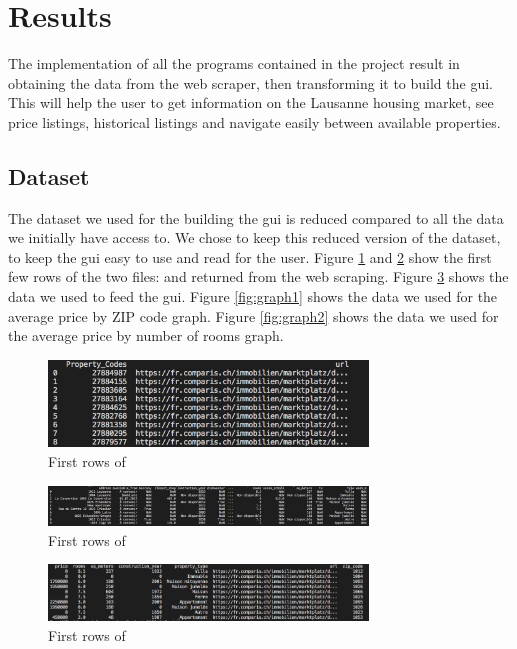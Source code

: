 \documentclass[main]{subfiles}
\begin{document}
\section{Results}
The implementation of all the programs contained in the project result in obtaining the data from the web scraper,
then transforming it to build the \ac{gui}.
This will help the user to get information on the Lausanne housing market, see price listings, historical listings and navigate easily between available properties.

\subsection{Dataset}
The dataset we used for the building the \ac{gui} is reduced compared to all the data we initially have access to. 
We chose to keep this reduced version of the dataset, to keep the \ac{gui} easy to use and read for the user. 
Figure \ref{fig:propcodes} and \ref{fig:propdetails} show the first few rows of the two \pkg[.csv] files:  and  returned from the web scraping.
Figure \ref{fig:dataxlsx} shows the data we used to feed the \ac{gui}.
Figure \ref{fig:graph1} shows the data we used for the average price by ZIP code graph.
Figure \ref{fig:graph2} shows the data we used for the average price by number of rooms graph.

\begin{figure}[htbp]
    \centerline{
        \includegraphics[width = 85mm]{prog_13.png}}
    \caption{First rows of }
    \label{fig:propcodes}
\end{figure}

\begin{figure}[htbp]
    \centerline{
        \includegraphics[width = 85mm]{prog_14.png}}
    \caption{First rows of }
    \label{fig:propdetails}
\end{figure}

\begin{figure}[htbp]
    \centerline{
        \includegraphics[width = 85mm]{prog_15.png}}
    \caption{First rows of }
    \label{fig:dataxlsx}
\end{figure}
\end{document}
